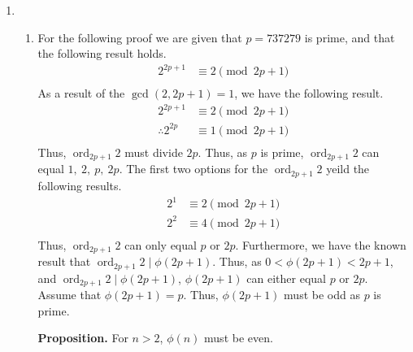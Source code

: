\documentclass[a4paper]{article}
\DeclareMathOperator\ord{ord}
\begin{document}
\begin{enumerate}
	\item 
	\begin{enumerate}
		\item For the following proof we are given that $\displaystyle{p = 737279}$ is prime, and that the following result holds.
		\begin{align*}
		2^{2p+1} & \equiv 2 \pmod{2p+1}\\
		\end{align*}
		As a result of the $\displaystyle{\gcd(2,2p+1) = 1}$, we have the following result.
		\begin{align*}
		2^{2p+1} & \equiv 2 \pmod{2p+1}\\
		\therefore 2^{2p} & \equiv 1 \pmod{2p+1}\\
		\end{align*}
		Thus, $\displaystyle{\ord_{2p+1}2}$ must divide $\displaystyle{2p}$. Thus, as $\displaystyle{p}$ is prime, $\displaystyle{\ord_{2p+1}2}$ can equal $\displaystyle{1,\:2,\:p,\:2p}$. The first two options for the $\displaystyle{\ord_{2p+1}2}$ yeild the following results.
		\begin{align*}
		2^1 & \equiv 2 \pmod{2p+1}\\
		2^2 & \equiv 4 \pmod{2p+1}\\
		\end{align*}
		Thus, $\displaystyle{\ord_{2p+1}2}$ can only equal $\displaystyle{p}$ or $\displaystyle{2p}$. Furthermore, we have the known result that $\displaystyle{\ord_{2p+1}2 \mid \phi(2p+1)}$. Thus, as $\displaystyle{0 < \phi(2p+1) < 2p+1}$, and $\displaystyle{\ord_{2p+1}2 \mid \phi(2p+1)}$, $\displaystyle{\phi(2p+1)}$ can either equal $\displaystyle{p}$ or $\displaystyle{2p}$. Assume that $\displaystyle{\phi(2p+1)=p}$. Thus, $\displaystyle{\phi(2p+1)}$ must be odd as $\displaystyle{p}$ is prime.

		\bigbreak

		\textbf{Proposition.} For $\displaystyle{n > 2}$, $\displaystyle{\phi(n)}$ must be even.

		\bigbreak


\end{enumerate}
\end{enumerate}
\end{document}
